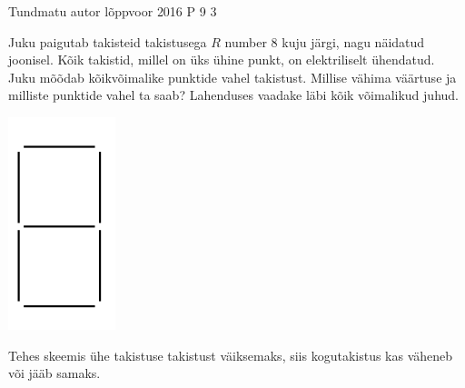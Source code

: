 {Tundmatu autor} %
{lõppvoor} %
{2016} %
{P 9} %
{3} %
{

\ifStatement
Juku paigutab takisteid takistusega $R$ number $8$ kuju järgi, nagu näidatud joonisel. Kõik takistid, millel on üks ühine punkt, on elektriliselt ühendatud. Juku mõõdab kõikvõimalike punktide vahel takistust. Millise vähima väärtuse ja milliste punktide vahel ta saab? Lahenduses vaadake läbi kõik võimalikud juhud. 
\begin{center}
	\includegraphics[width=0.5\linewidth]{2016-v3p-09-yl.png}
\end{center}
\fi

\ifHint
Tehes skeemis ühe takistuse takistust väiksemaks, siis kogutakistus kas väheneb või jääb samaks.
\fi

}
